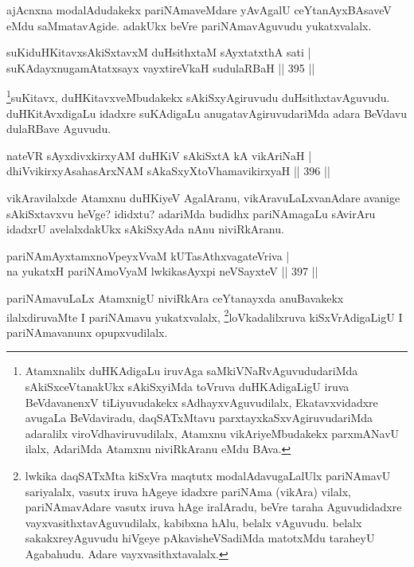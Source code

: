 \begin{artha}
ajAcnxna modalAdudakekx pariNAmaveMdare yAvAgalU ceYtanAyxBAsaveV eMdu saMmatavAgide. adakUkx beVre pariNAmavAguvudu yukatxvalalx.
\end{artha}


\begin{shl}
suKiduHKitavxsAkiSxtavxM duHsithxtaM sAyxtatxthA sati | \\
suKAdayxnugamAtatxsayx vayxtireVkaH sudulaRBaH \hfill||  395 ||  
\end{shl}

\begin{artha}
\footnote{Atamxnalilx duHKAdigaLu iruvAga saMkiVNaRvAguvududariMda sAkiSxceVtanakUkx sAkiSxyiMda toVruva duHKAdigaLigU iruva BeVdavanenxV tiLiyuvudakekx sAdhayxvAguvudilalx, Ekatavxvidadxre avugaLa BeVdaviradu, daqSATxMtavu parxtayxkaSxvAgiruvudariMda adaralilx viroVdhaviruvudilalx, Atamxnu vikAriyeMbudakekx parxmANavU ilalx, AdariMda Atamxnu niviRkAranu eMdu BAva.}suKitavx, duHKitavxveMbudakekx sAkiSxyAgiruvudu duHsithxtavAguvudu. duHKitAvxdigaLu idadxre suKAdigaLu anugatavAgiruvudariMda adara BeVdavu dulaRBave Aguvudu.
\end{artha}


\begin{shl}
nateVR sAyxdivxkirxyAM duHKiV sAkiSxtA kA vikAriNaH | \\
dhiVvikirxyAsahasArxNAM sAkaSxyXtoV\s hamavikirxyaH \hfill||  396 ||  
\end{shl}

\begin{artha}
vikAravilalxde Atamxnu duHKiyeV AgalAranu, vikAravuLaLxvanAdare avanige sAkiSxtavxvu heVge? ididxtu? adariMda budidhx pariNAmagaLu sAvirAru idadxrU avelalxdakUkx sAkiSxyAda nAnu niviRkAranu.
\end{artha}

\begin{shl}
pariNAmAyxtamxnoV\s peyxVvaM kUTasAthxvagateVriva | \\
na yukatxH pariNAmoV\s yaM lwkikasAyxpi neVSayxteV \hfill||  397 ||  
\end{shl}

\begin{artha}
pariNAmavuLaLx AtamxnigU niviRkAra ceYtanayxda anuBavakekx ilalxdiruvaMte I pariNAmavu yukatxvalalx, \footnote{lwkika daqSATxMta kiSxVra maqtutx modalAdavugaLalUlx pariNAmavU sariyalalx, vasutx iruva hAgeye idadxre pariNAma (vikAra) vilalx, pariNAmavAdare vasutx iruva hAge iralAradu, beVre taraha Aguvudidadxre vayxvasithxtavAguvudilalx, kabibxna hAlu, belalx vAguvudu. belalx sakakxreyAguvudu hiVgeye pAkavisheVSadiMda matotxMdu taraheyU Agabahudu. Adare vayxvasithxtavalalx.}loVkadalilxruva kiSxVrAdigaLigU I pariNAmavanunx opupxvudilalx.
\end{artha}


